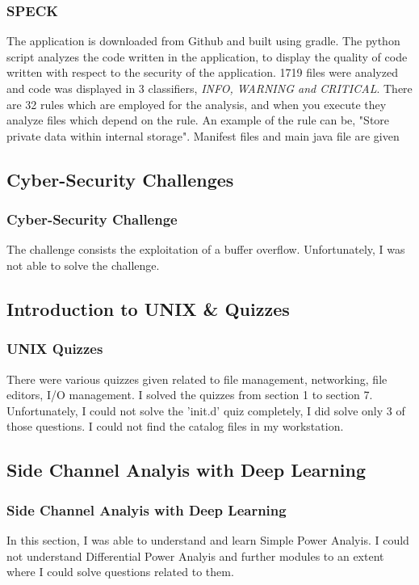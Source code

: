 \documentclass{beamer}
\begin{document}
\begin{frame}
    \frametitle{SPECK}
    The application is downloaded from Github and built using gradle. The python script analyzes the code written in the application, to display the quality of code written with respect to 
    the security of the application. 1719 files were analyzed and code was displayed in 3 classifiers, \textit{INFO, WARNING and CRITICAL}. There are 32 rules which are employed
    for the analysis, and when you execute they analyze files which depend on the rule. An example of the rule can be, "Store private data within internal storage". Manifest files and main java file are given 
\end{frame}

\subsection{Cyber-Security Challenges}
\begin{frame}
    \frametitle{Cyber-Security Challenge}
    The challenge consists the exploitation of a buffer overflow. Unfortunately, I was not able to solve the challenge. 
\end{frame}

\subsection{Introduction to UNIX \& Quizzes}
\begin{frame}
    \frametitle{UNIX Quizzes}
    There were various quizzes given related to file management, networking, file editors, I/O management. 
    I solved the quizzes from section 1 to section 7.
    Unfortunately, I could not solve the 'init.d' quiz completely, I did solve only 3 of those questions.
    I could not find the catalog files in my workstation.
\end{frame}

\subsection{Side Channel Analyis with Deep Learning}
\begin{frame}
    \frametitle{Side Channel Analyis with Deep Learning}
In this section, I was able to understand and learn Simple Power Analyis. I could not understand Differential Power Analyis and further modules to an extent where I could solve questions related to them.
\end{frame}
\end{document}
